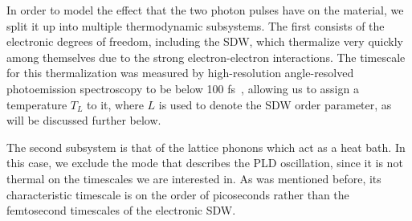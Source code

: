 
In order to model the effect that the two photon pulses have on the material, we split it up into multiple thermodynamic subsystems.
The first consists of the electronic degrees of freedom, including the \gls{SDW}, which thermalize very quickly among themselves due to the strong electron-electron interactions.
The timescale for this thermalization was measured by high-resolution angle-resolved photoemission spectroscopy to be below 100 fs~\cite{Nicholson2016}, allowing us to assign a temperature $T_L$ to it, where $L$ is used to denote the \gls{SDW} order parameter, as will be discussed further below.

The second subsystem is that of the lattice phonons which act as a heat bath.
In this case, we exclude the mode that describes the \gls{PLD} oscillation, since it is not thermal on the timescales we are interested in. As was mentioned before, its characteristic timescale is on the order of picoseconds rather than the femtosecond timescales of the electronic \gls{SDW}.

